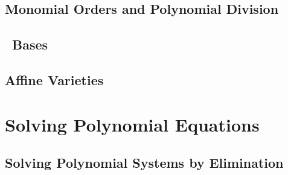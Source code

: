 \documentclass[letterpaper, 11pt, oneside]{book}
\begin{document}
\clearpage

\section{Monomial Orders and Polynomial Division}

\begin{sol}\label{ex:UAG_1.2.6}

\end{sol}

\clearpage

\section{\Grobner\ Bases}

\begin{sol}\label{ex:UAG_1.3.11}

\end{sol}

\clearpage

\section{Affine Varieties}

\begin{sol}\label{ex:UAG_1.4.9}

\end{sol}

\chapter{Solving Polynomial Equations}

\section{Solving Polynomial Systems by Elimination}

\begin{sol}\label{ex:UAG_2.1.1}

\end{sol}

\begin{sol}\label{ex:UAG_2.1.2}

\end{sol}
\end{document}
